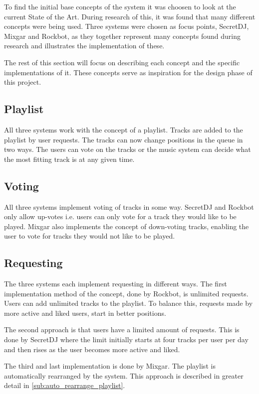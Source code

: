 To find the initial base concepts of the system it was choosen to look at the current State of the Art. During research of this, it was found that many different concepts were being used. Three systems
were chosen as focus points, SecretDJ, Mixgar and Rockbot, as they together
represent many concepts found during research and illustrates the
implementation of these.

The rest of this section will focus on describing each concept and the
specific implementations of it. These concepts serve as inspiration for
the design phase of this project.

\subsection{Playlist}
All three systems work with the concept of a playlist. Tracks are
added to the playlist by user requests. The tracks can now change
positions in the queue in two ways. The users can vote on the tracks
or the music system can decide what the most fitting track is at any 
given time.

\subsection{Voting}
All three systems implement voting of tracks in some way. SecretDJ and
Rockbot only allow up-votes i.e. users can only vote for a track they would like to be
played. Mixgar also implements the concept of down-voting
tracks, enabling the user to vote for tracks they would not like to be played.

\subsection{Requesting}
The three systems each implement requesting in different ways. The
first implementation method of the concept, done by Rockbot, is
unlimited requests. Users can add unlimited tracks to the
playlist. To balance this, requests made by more active and liked
users, start in better positions.

The second approach is that users have a limited amount of
requests. This is done by SecretDJ where the limit initially starts at
four tracks per user per day and then rises as the user becomes more
active and liked.

The third and last implementation is done by Mixgar. The playlist is
automatically rearranged by the system. This approach is described in
greater detail in \cref{sub:auto_rearrange_playlist}.

